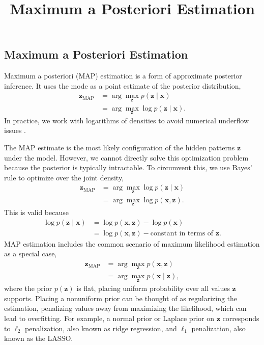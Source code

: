 \title{Maximum a Posteriori Estimation}

\subsection{Maximum a Posteriori Estimation}

Maximum a posteriori (MAP) estimation is a form of approximate
posterior inference. It uses the mode as a point estimate of the
posterior distribution,
\begin{align*}
  \mathbf{z}_\text{MAP}
  &=
  \arg \max_\mathbf{z}
  p(\mathbf{z} \mid \mathbf{x})\\
  &=
  \arg \max_\mathbf{z}
  \log p(\mathbf{z} \mid \mathbf{x}).
\end{align*}
In practice, we work with logarithms of densities to avoid numerical underflow
issues \citep{murphy2012machine}.

The MAP estimate is the most likely configuration of the hidden patterns $\mathbf{z}$
under the model. However, we cannot directly solve this optimization problem
because the posterior is typically intractable. To circumvent this, we use Bayes' rule to
optimize over the joint density,
\begin{align*}
  \mathbf{z}_\text{MAP}
  &=
  \arg \max_\mathbf{z}
  \log p(\mathbf{z} \mid \mathbf{x})\\
  &=
  \arg \max_\mathbf{z}
  \log p(\mathbf{x}, \mathbf{z}).
\end{align*}
This is valid because
\begin{align*}
  \log p(\mathbf{z} \mid \mathbf{x})
  &=
  \log p(\mathbf{x}, \mathbf{z}) - \log p(\mathbf{x})\\
  &=
  \log p(\mathbf{x}, \mathbf{z}) - \text{constant in terms of } \mathbf{z}.
\end{align*}
MAP estimation includes the common scenario of maximum
likelihood estimation as a special case,
\begin{align*}
  \mathbf{z}_\text{MAP}
  &=
  \arg \max_\mathbf{z}
  p(\mathbf{x}, \mathbf{z})\\
  &=
  \arg \max_\mathbf{z}
  p(\mathbf{x}\mid \mathbf{z}),
\end{align*}
where the prior $p(\mathbf{z})$ is flat, placing uniform probability over all
values $\mathbf{z}$ supports. Placing a nonuniform prior can be thought of as
regularizing the estimation, penalizing values away from maximizing
the likelihood, which can lead to overfitting. For example, a normal
prior or Laplace prior on $\mathbf{z}$ corresponds to $\ell_2$ penalization, also
known as ridge regression, and $\ell_1$ penalization, also
known as the LASSO.

